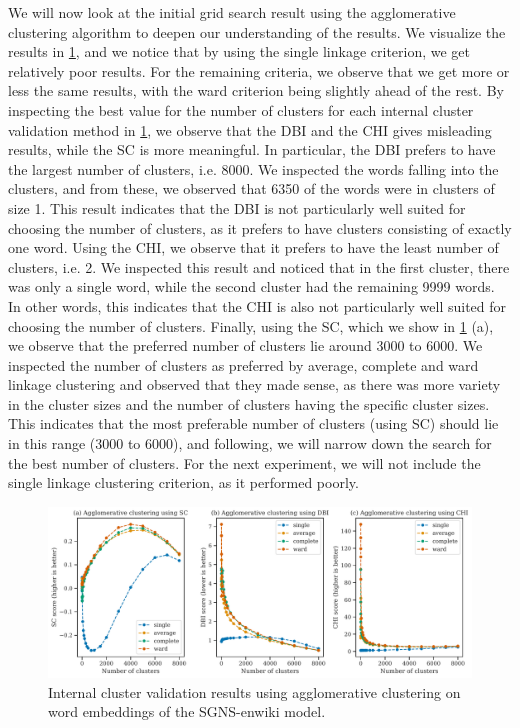 We will now look at the initial grid search result using the agglomerative clustering algorithm to deepen our understanding of the results. We visualize the results in \cref{fig:cluster-analysis-agglomerative-internal-cluster-validation}, and we notice that by using the single linkage criterion, we get relatively poor results. For the remaining criteria, we observe that we get more or less the same results, with the ward criterion being slightly ahead of the rest. By inspecting the best value for the number of clusters for each internal cluster validation method in \cref{fig:cluster-analysis-agglomerative-internal-cluster-validation}, we observe that the DBI and the CHI gives misleading results, while the SC is more meaningful. In particular, the DBI prefers to have the largest number of clusters, i.e. 8000. We inspected the words falling into the clusters, and from these, we observed that 6350 of the words were in clusters of size 1. This result indicates that the DBI is not particularly well suited for choosing the number of clusters, as it prefers to have clusters consisting of exactly one word. Using the CHI, we observe that it prefers to have the least number of clusters, i.e. 2. We inspected this result and noticed that in the first cluster, there was only a single word, while the second cluster had the remaining 9999 words. In other words, this indicates that the CHI is also not particularly well suited for choosing the number of clusters. Finally, using the SC, which we show in \cref{fig:cluster-analysis-agglomerative-internal-cluster-validation} (a), we observe that the preferred number of clusters lie around 3000 to 6000. We inspected the number of clusters as preferred by average, complete and ward linkage clustering and observed that they made sense, as there was more variety in the cluster sizes and the number of clusters having the specific cluster sizes. This indicates that the most preferable number of clusters (using SC) should lie in this range (3000 to 6000), and following, we will narrow down the search for the best number of clusters. For the next experiment, we will not include the single linkage clustering criterion, as it performed poorly.
\begin{figure}[H]
    \centering
    \includegraphics[width=\textwidth]{thesis/figures/cluster-analysis-agglomerative-internal-cluster-validation.pdf}
    \caption{Internal cluster validation results using agglomerative clustering on word embeddings of the SGNS-enwiki model.}
    \label{fig:cluster-analysis-agglomerative-internal-cluster-validation}
\end{figure}

